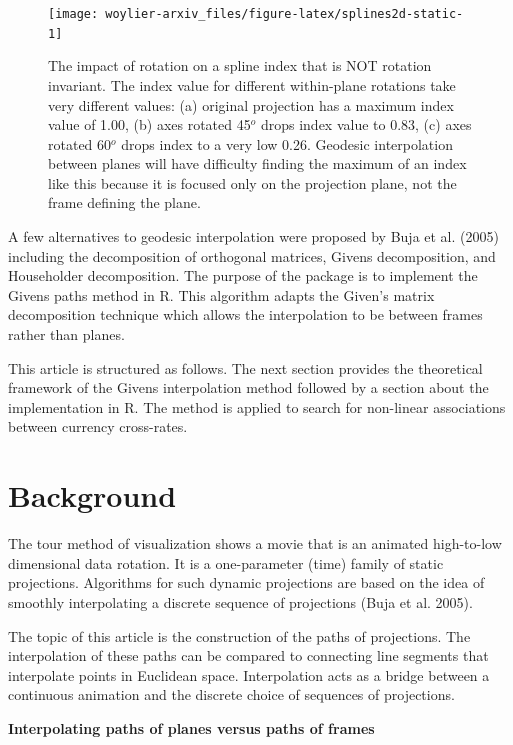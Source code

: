 \documentclass[
]{article}
\begin{document}
\begin{figure}
\texttt{[image: woylier-arxiv\_files/figure-latex/splines2d-static-1]} \caption{The impact of rotation on a spline index that is NOT rotation invariant. The index value for different within-plane rotations take very different values: (a) original projection has a maximum index value of 1.00, (b) axes rotated 45$^o$ drops index value to 0.83, (c) axes rotated 60$^o$ drops index to a very low 0.26. Geodesic interpolation between planes will have difficulty finding the maximum of an index like this because it is focused only on the projection plane, not the frame defining the plane.}\label{fig:splines2d-static}
\end{figure}

A few alternatives to geodesic interpolation were proposed by Buja et
al. (2005) including the decomposition of orthogonal matrices, Givens
decomposition, and Householder decomposition. The purpose of the
 package is to implement the Givens paths method in R.
This algorithm adapts the Given's matrix decomposition technique which
allows the interpolation to be between frames rather than planes.

This article is structured as follows. The next section provides the
theoretical framework of the Givens interpolation method followed by a
section about the implementation in R. The method is applied to search
for non-linear associations between currency cross-rates.

\hypertarget{background}{%
\section{Background}\label{background}}

The tour method of visualization shows a movie that is an animated
high-to-low dimensional data rotation. It is a one-parameter (time)
family of static projections. Algorithms for such dynamic projections
are based on the idea of smoothly interpolating a discrete sequence of
projections (Buja et al. 2005).

The topic of this article is the construction of the paths of
projections. The interpolation of these paths can be compared to
connecting line segments that interpolate points in Euclidean space.
Interpolation acts as a bridge between a continuous animation and the
discrete choice of sequences of projections.

\textbf{Interpolating paths of planes versus paths of frames}
\end{document}

